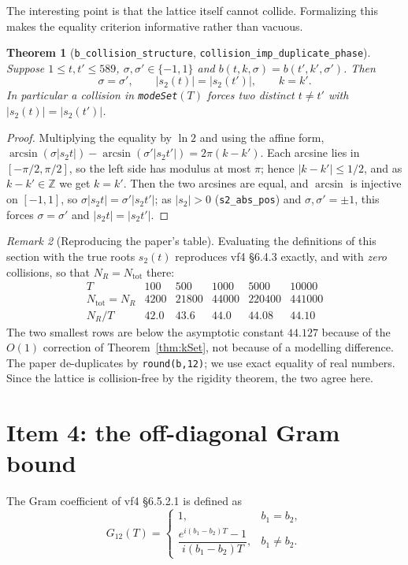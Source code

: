 \documentclass[11pt,a4paper]{article}
\newcommand{\Z}{\mathbb{Z}}
\newcommand{\lb}{\_\allowbreak}
\newcommand{\code}[1]{\texttt{#1}}
\newtheorem{theorem}{Theorem}[section]
\theoremstyle{definition}
\theoremstyle{remark}
\newtheorem{remark}[theorem]{Remark}
\begin{document}
The interesting point is that the lattice itself cannot collide.  Formalizing this makes
the equality criterion informative rather than vacuous.

\begin{theorem}[\code{b\lb collision\lb structure}, \code{collision\lb imp\lb duplicate\lb phase}]
Suppose $1\le t,t'\le589$, $\sigma,\sigma'\in\{-1,1\}$ and
$b(t,k,\sigma)=b(t',k',\sigma')$.  Then
\[
  \sigma=\sigma',\qquad |s_2(t)|=|s_2(t')|,\qquad k=k' .
\]
In particular a collision in \code{modeSet}$(T)$ forces two distinct $t\neq t'$ with
$|s_2(t)|=|s_2(t')|$.
\end{theorem}
\begin{proof}
Multiplying the equality by $\ln2$ and using the affine form,
$\arcsin(\sigma|s_2 t|)-\arcsin(\sigma'|s_2 t'|)=2\pi(k-k')$.  Each arcsine lies in
$[-\pi/2,\pi/2]$, so the left side has modulus at most $\pi$; hence
$|k-k'|\le1/2$, and as $k-k'\in\Z$ we get $k=k'$.  Then the two arcsines are equal, and
$\arcsin$ is injective on $[-1,1]$, so $\sigma|s_2t|=\sigma'|s_2 t'|$; as
$|s_2|>0$ (\code{s2\lb abs\lb pos}) and $\sigma,\sigma'=\pm1$, this forces
$\sigma=\sigma'$ and $|s_2t|=|s_2t'|$.
\end{proof}

\begin{remark}[Reproducing the paper's table]
Evaluating the definitions of this section with the true roots $s_2(t)$ reproduces vf4
\S6.4.3 exactly, and with \emph{zero} collisions, so that $N_R=N_{\mathrm{tot}}$ there:
\[
\begin{array}{r|rrrrr}
T & 100 & 500 & 1000 & 5000 & 10000\\\hline
N_{\mathrm{tot}}=N_R & 4200 & 21800 & 44000 & 220400 & 441000\\
N_R/T & 42.0 & 43.6 & 44.0 & 44.08 & 44.10
\end{array}
\]
The two smallest rows are below the asymptotic constant $44.127$ because of the $O(1)$
correction of Theorem~\ref{thm:kSet}, not because of a modelling difference.  The paper
de-duplicates by \code{round(b,12)}; we use exact equality of real numbers.  Since the
lattice is collision-free by the rigidity theorem, the two agree here.
\end{remark}

\section{Item 4: the off-diagonal Gram bound}\label{sec:item4}

The Gram coefficient of vf4 \S6.5.2.1 is defined as
\[
  G_{12}(T)=\begin{cases}1,& b_1=b_2,\\[2pt]
  \dfrac{e^{i(b_1-b_2)T}-1}{i(b_1-b_2)T},& b_1\neq b_2.\end{cases}
\]
\end{document}
